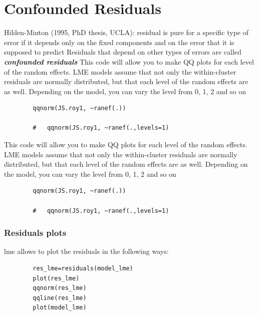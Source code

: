 \documentclass[12pt, a4paper]{report}
\theoremstyle{plain}
\theoremstyle{definition}
\theoremstyle{remark}
\begin{document}
	\section{Confounded Residuals}
	Hilden-Minton (1995, PhD thesis, UCLA): residual is pure for a specific type of error if it depends only on the fixed components and
	on the error that it is supposed to predict	Residuals that depend on other types of errors are called \textit{\textbf{confounded
			residuals}}
	This code will allow you to make QQ plots for each level of the random effects.  LME models assume that not only the within-cluster residuals are normally distributed, but that each level of the random effects are as well. Depending on the model, you can vary the level from 0, 1, 2 and so on
	\begin{framed}
		\begin{verbatim}
		qqnorm(JS.roy1, ~ranef(.))
		
		# 	qqnorm(JS.roy1, ~ranef(.,levels=1)
		\end{verbatim}
	\end{framed}
	This code will allow you to make QQ plots for each level of the random effects.  LME models assume that not only the within-cluster residuals are normally distributed, but that each level of the random effects are as well. Depending on the model, you can vary the level from 0, 1, 2 and so on
	\begin{framed}
		\begin{verbatim}
		qqnorm(JS.roy1, ~ranef(.))
		
		# 	qqnorm(JS.roy1, ~ranef(.,levels=1)
		\end{verbatim}
	\end{framed}
	\subsubsection{Residuals plots}
	
	lme allows to plot the residuals in the following ways:
	
	\begin{framed}
		\begin{verbatim}
		res_lme=residuals(model_lme)
		plot(res_lme)
		qqnorm(res_lme)
		qqline(res_lme)
		plot(model_lme)
		\end{verbatim}
	\end{framed}
	
\end{document}
